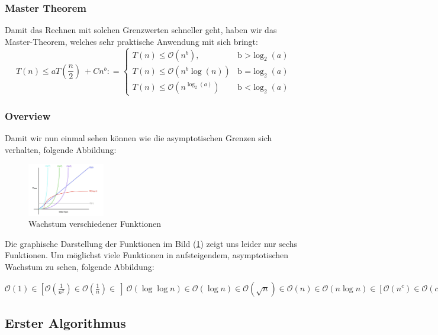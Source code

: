 \documentclass[a4paper]{article}
\begin{document}
    \subsubsection{Master Theorem}
    Damit das Rechnen mit solchen Grenzwerten schneller geht, haben wir das Master-Theorem, welches sehr praktische Anwendung mit sich bringt:
      \begin{equation} \label{MasterTheorem}
  T(n) \leq aT(\frac{n}{2})\ + Cn^b: =\begin{cases}      T(n) \leq \mathcal{O}(n^b), & \text{b >} \log_2(a)\\
      T(n) \leq \mathcal{O}(n^b\log(n)) &\text{b =} \log_2(a)\\
      T(n) \leq \mathcal{O}(n^{\log_2(a)}) & \text{b <} \log_2(a)
    \end{cases}         
  \end{equation}

    \subsubsection{Overview}
    Damit wir nun einmal sehen können wie die asymptotischen Grenzen sich verhalten, folgende Abbildung: 
    \begin{figure}[h]
        \centering
        \includegraphics[width=0.3\textwidth]{Pictures/big-o-notation.jpg}
        \caption{Wachstum verschiedener Funktionen}
        \label{fig: WachstumBigO}
    \end{figure}
    Die graphische Darstellung der Funktionen im Bild (\ref{fig: WachstumBigO}) zeigt uns leider nur sechs Funktionen. 
    Um möglichst viele Funktionen in aufsteigendem, asymptotischen Wachstum zu sehen, folgende Abbildung:

    $\mathcal{O}(1) \in [\mathcal{O}(\frac{1}{n^2}) \in \mathcal{O}(\frac{1}{n}) \in \ ] \  \mathcal{O}(\log \log n)\in \mathcal{O}(\log n) \in \mathcal{O}(\sqrt{n}) \in \mathcal{O}(n) \in \mathcal{O}(n\log n) \in [\mathcal{O}({n^c}) \in \mathcal{O}(c^n) \in \ ] \mathcal{O}(n^2) \in \mathcal{O}(2^n) \in \mathcal{O}(2^{n^{2}}) \in \mathcal{O}(n!) $

\newpage
\subsection{Erster Algorithmus}
\end{document}
